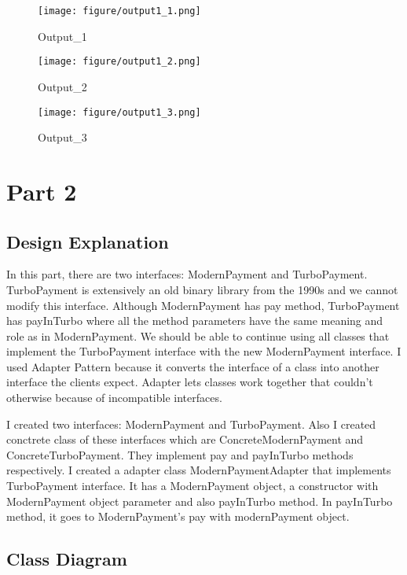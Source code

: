 \documentclass[twoside,11pt]{article}
\begin{document}
\newpage

\begin{figure}[h]
\caption{Output_1}
\centering
\texttt{[image: figure/output1\_1.png]}
\end{figure}

\begin{figure}[h]
\caption{Output_2}
\centering
\texttt{[image: figure/output1\_2.png]}
\end{figure}

\begin{figure}[h]
\caption{Output_3}
\centering
\texttt{[image: figure/output1\_3.png]}
\end{figure}

\newpage

\section{Part 2} 
\label{sec:background}

\subsection{Design Explanation}

In this part, there are two interfaces: ModernPayment and TurboPayment. TurboPayment is extensively an old binary library from the 1990s and we cannot modify this interface. Although ModernPayment has pay method, TurboPayment has payInTurbo where all the method parameters have the same meaning and role as in ModernPayment. We should be able to continue using all classes that implement the TurboPayment interface with the new ModernPayment interface. I used Adapter Pattern because it converts the interface of a class into another interface the clients expect. Adapter lets classes work together that couldn't otherwise because of incompatible interfaces.\newline

I created two interfaces: ModernPayment and TurboPayment. Also I created conctrete class of these interfaces which are ConcreteModernPayment and ConcreteTurboPayment. They implement pay and payInTurbo methods respectively. I created a adapter class ModernPaymentAdapter that implements TurboPayment interface. It has a ModernPayment object, a constructor with ModernPayment object parameter and also payInTurbo method. In payInTurbo method, it goes to ModernPayment's pay with modernPayment object.

\newpage
\subsection{Class Diagram}
\end{document}
